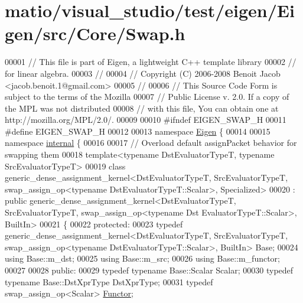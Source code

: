 \hypertarget{matio_2visual__studio_2test_2eigen_2_eigen_2src_2_core_2_swap_8h_source}{}\section{matio/visual\+\_\+studio/test/eigen/\+Eigen/src/\+Core/\+Swap.h}
\label{matio_2visual__studio_2test_2eigen_2_eigen_2src_2_core_2_swap_8h_source}

\begin{DoxyCode}
00001 \textcolor{comment}{// This file is part of Eigen, a lightweight C++ template library}
00002 \textcolor{comment}{// for linear algebra.}
00003 \textcolor{comment}{//}
00004 \textcolor{comment}{// Copyright (C) 2006-2008 Benoit Jacob <jacob.benoit.1@gmail.com>}
00005 \textcolor{comment}{//}
00006 \textcolor{comment}{// This Source Code Form is subject to the terms of the Mozilla}
00007 \textcolor{comment}{// Public License v. 2.0. If a copy of the MPL was not distributed}
00008 \textcolor{comment}{// with this file, You can obtain one at http://mozilla.org/MPL/2.0/.}
00009 
00010 \textcolor{preprocessor}{#ifndef EIGEN\_SWAP\_H}
00011 \textcolor{preprocessor}{#define EIGEN\_SWAP\_H}
00012 
00013 \textcolor{keyword}{namespace }\hyperlink{namespace_eigen}{Eigen} \{ 
00014 
00015 \textcolor{keyword}{namespace }\hyperlink{namespaceinternal}{internal} \{
00016 
00017 \textcolor{comment}{// Overload default assignPacket behavior for swapping them}
00018 \textcolor{keyword}{template}<\textcolor{keyword}{typename} DstEvaluatorTypeT, \textcolor{keyword}{typename} SrcEvaluatorTypeT>
00019 \textcolor{keyword}{class }generic\_dense\_assignment\_kernel<DstEvaluatorTypeT, SrcEvaluatorTypeT, swap\_assign\_op<typename 
      DstEvaluatorTypeT::Scalar>, Specialized>
00020  : \textcolor{keyword}{public} generic\_dense\_assignment\_kernel<DstEvaluatorTypeT, SrcEvaluatorTypeT, swap\_assign\_op<typename Dst
      EvaluatorTypeT::Scalar>, BuiltIn>
00021 \{
00022 \textcolor{keyword}{protected}:
00023   \textcolor{keyword}{typedef} generic\_dense\_assignment\_kernel<DstEvaluatorTypeT, SrcEvaluatorTypeT, swap\_assign\_op<typename
       DstEvaluatorTypeT::Scalar>, BuiltIn> Base;
00024   \textcolor{keyword}{using} Base::m\_dst;
00025   \textcolor{keyword}{using} Base::m\_src;
00026   \textcolor{keyword}{using} Base::m\_functor;
00027   
00028 \textcolor{keyword}{public}:
00029   \textcolor{keyword}{typedef} \textcolor{keyword}{typename} Base::Scalar Scalar;
00030   \textcolor{keyword}{typedef} \textcolor{keyword}{typename} Base::DstXprType DstXprType;
00031   \textcolor{keyword}{typedef} swap\_assign\_op<Scalar> \hyperlink{struct_functor}{Functor};

\end{DoxyCode}
